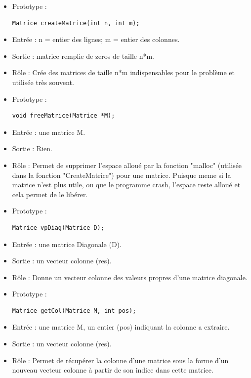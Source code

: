 \documentclass[12pt]{article}
\begin{document}

\begin{itemize}
    \item Prototype : 
    \begin{verbatim}
Matrice createMatrice(int n, int m);
    \end{verbatim}
    \item Entrée : n = entier des lignes; m = entier des colonnes. 
    \item Sortie : matrice remplie de zeros de taille n*m.
    \item Rôle : Crée des matrices de taille n*m indispensables pour le problème et utilisée très souvent.
\end{itemize}


\begin{itemize}
    \item Prototype : 
    \begin{verbatim}
void freeMatrice(Matrice *M);
    \end{verbatim}
    \item Entrée : une matrice M.
    \item Sortie : Rien.
    \item Rôle : Permet de supprimer l'espace alloué par la fonction "malloc" (utilisée dans la fonction "CreateMatrice") pour une matrice. Puisque meme si la matrice n'est plus utile, ou que le programme crash, l'espace reste alloué et cela permet de le libérer.
\end{itemize}


\begin{itemize}
    \item Prototype : 
    \begin{verbatim}
Matrice vpDiag(Matrice D); 
    \end{verbatim}
    \item Entrée : une matrice Diagonale (D).
    \item Sortie : un vecteur colonne (res).
    \item Rôle : Donne un vecteur colonne des valeurs propres d'une matrice diagonale.
\end{itemize}


\begin{itemize}
    \item Prototype : 
    \begin{verbatim}
Matrice getCol(Matrice M, int pos);
    \end{verbatim}
    \item Entrée : une matrice M, un entier (pos) indiquant la colonne a extraire.
    \item Sortie : un vecteur colonne (res).
    \item Rôle : Permet de récupérer la colonne d'une matrice sous la forme d'un nouveau vecteur colonne à partir de son indice dans cette matrice.
\end{itemize}
\end{document}
